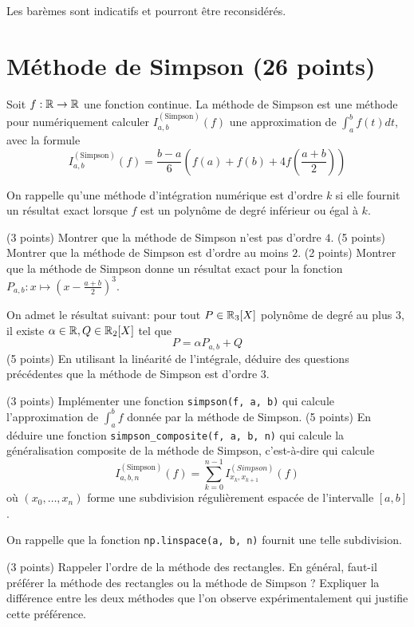 
Les barèmes sont indicatifs et pourront être reconsidérés.

\section*{Méthode de Simpson (26 points)}

Soit $ f : \mathbb{R} \rightarrow \mathbb{R} $ une fonction continue. La méthode de Simpson est une méthode pour numériquement calculer $ I^{(\textrm{Simpson})}_{a, b}(f) $ une approximation de $ \int_{a}^{b} f(t)dt $, avec la formule \[
    I^{(\textrm{Simpson})}_{a, b}(f) = \frac{b-a}{6} (f(a) + f(b) + 4 f(\frac{a+b}{2}))
\]

On rappelle qu'une méthode d'intégration numérique est d'ordre $ k $ si elle fournit un résultat exact lorsque $ f $ est un polynôme de degré inférieur ou égal à $ k $.

\ques (3 points) Montrer que la méthode de Simpson n'est pas d'ordre $ 4 $.
\ques (5 points) Montrer que la méthode de Simpson est d'ordre au moins $ 2 $.
\ques (2 points) Montrer que la méthode de Simpson donne un résultat exact pour la fonction $ P_{a,b} : x \mapsto (x - \frac{a+b}{2})^3 $.

On admet le résultat suivant: pour tout $ P \in \mathbb{R}_3[X] $ polynôme de degré au plus $ 3 $, il existe $ \alpha \in \mathbb{R}, Q \in \mathbb{R}_2[X] $ tel que \[
    P = \alpha P_{a, b} + Q
\]
\ques (5 points) En utilisant la linéarité de l'intégrale, déduire des questions précédentes que la méthode de Simpson est d'ordre $ 3 $.

\quessques (3 points) Implémenter une fonction \texttt{simpson(f, a, b)} qui calcule l'approximation de $ \int_{a}^{b} f $ donnée par la méthode de Simpson.
\ssques (5 points) En déduire une fonction \texttt{simpson_composite(f, a, b, n)} qui calcule la généralisation composite de la méthode de Simpson, c'est-à-dire qui calcule \[
    I^{(\textrm{Simpson})}_{a, b, n}(f) = \sum_{k=0}^{n-1} I^{(Simpson)}_{x_k, x_{k+1}}(f)
\]
où $ (x_0, \ldots, x_n) $ forme une subdivision régulièrement espacée de l'intervalle $ [a, b] $. 

On rappelle que la fonction \texttt{np.linspace(a, b, n)} fournit une telle subdivision.

\ques (3 points) Rappeler l'ordre de la méthode des rectangles. En général, faut-il préférer la méthode des rectangles ou la méthode de Simpson ? Expliquer la différence entre les deux méthodes que l'on observe expérimentalement qui justifie cette préférence.



